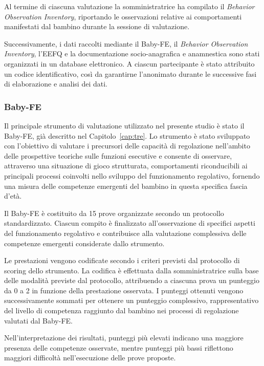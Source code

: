 Al termine di ciascuna valutazione la somministratrice ha compilato il \emph{Behavior Observation Inventory}, riportando le osservazioni relative ai comportamenti manifestati dal bambino durante la sessione di valutazione.

Successivamente, i dati raccolti mediante il Baby-FE, il \emph{Behavior Observation Inventory}, l'EEFQ e la documentazione socio-anagrafica e anamnestica sono stati organizzati in un database elettronico. A ciascun partecipante è stato attribuito un codice identificativo, così da garantirne l'anonimato durante le successive fasi di elaborazione e analisi dei dati.

 \subsubsection{Baby-FE}
 \label{sec:4_2_3_2}

Il principale strumento di valutazione utilizzato nel presente studio è stato il \mbox{Baby-FE}, già descritto nel Capitolo~\ref{cap:tre}. Lo strumento è stato sviluppato con l'obiettivo di valutare i precursori delle capacità di regolazione nell'ambito delle prospettive teoriche sulle funzioni esecutive e consente di osservare, attraverso una situazione di gioco strutturata, comportamenti riconducibili ai principali processi coinvolti nello sviluppo del funzionamento regolativo, fornendo una misura delle competenze emergenti del bambino in questa specifica fascia d'età.

Il Baby-FE è costituito da 15 prove organizzate secondo un protocollo standardizzato. Ciascun compito è finalizzato all'osservazione di specifici aspetti del funzionamento regolativo e contribuisce alla valutazione complessiva delle competenze emergenti considerate dallo strumento.

Le prestazioni vengono codificate secondo i criteri previsti dal protocollo di scoring dello strumento. La codifica è effettuata dalla somministratrice sulla base delle modalità previste dal protocollo, attribuendo a ciascuna prova un punteggio da 0 a 2 in funzione della prestazione osservata. I punteggi ottenuti vengono successivamente sommati per ottenere un punteggio complessivo, rappresentativo del livello di competenza raggiunto dal bambino nei processi di regolazione valutati dal Baby-FE.

Nell'interpretazione dei risultati, punteggi più elevati indicano una maggiore presenza delle competenze osservate, mentre punteggi più bassi riflettono maggiori difficoltà nell'esecuzione delle prove proposte. 

